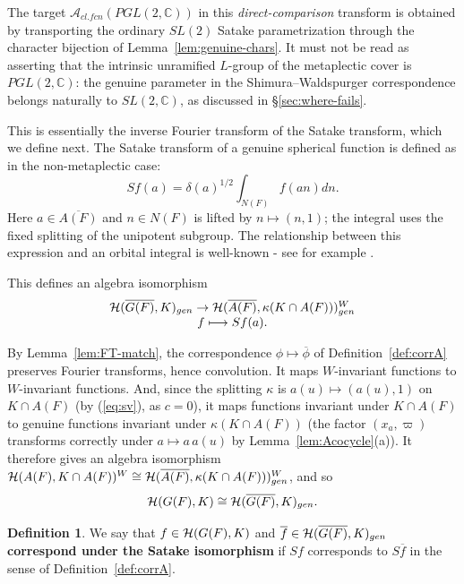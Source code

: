 \documentclass[12pt,letterpaper,openany]{book}
\theoremstyle{plain}
\theoremstyle{definition}
\newtheorem{definition}[theorem]{Definition}
\theoremstyle{remark}
\theoremstyle{remark}
\begin{document}
The target $\mathcal A_{cl.fcn}(PGL(2,\mathbb C))$
in this \emph{direct-comparison} transform is obtained by
transporting the ordinary $SL(2)$ Satake parametrization
through the character bijection of Lemma~\ref{lem:genuine-chars}.
It must not be read as asserting that the intrinsic unramified
$L$-group of the metaplectic cover is $PGL(2,\mathbb C)$:
the genuine parameter in the Shimura--Waldspurger correspondence
belongs naturally to $SL(2,\mathbb C)$, as discussed in
\S\ref{sec:where-fails}.

This is essentially the inverse Fourier transform of the Satake
transform, which we define next. The Satake transform of a
genuine spherical function is defined as in the non-metaplectic case:
\begin{equation}
Sf(a)=\delta(a)^{1/2}\int_{N(F)}f(an)dn.
\end{equation}
Here $a\in\overline{A(F)}$ and $n\in N(F)$ is lifted by
$n\mapsto(n,1)$; the integral uses the fixed splitting of the
unipotent subgroup.
The relationship between this expression and an orbital integral
is well-known - see for example \cite{C}.

This defines an algebra isomorphism
\begin{equation}
\begin{array}{c}
{\cal{H}}(\overline{G(F)},K)_{gen}\rightarrow
{\cal{H}}(\overline{A(F)},\kappa(K\cap A(F)))^W_{gen}\\
f\longmapsto Sf(a).
\end{array}
\end{equation}

By Lemma~\ref{lem:FT-match}, the correspondence $\phi\mapsto\overline\phi$
of Definition~\ref{def:corrA} preserves Fourier transforms, hence
convolution. It maps $W$-invariant functions to $W$-invariant functions.
And, since the splitting $\kappa$ is $a(u)\mapsto(a(u),1)$ on $K\cap A(F)$
(by (\ref{eq:sv}), as $c=0$), it maps functions invariant under
$K\cap A(F)$ to genuine functions invariant under $\kappa(K\cap A(F))$
(the factor $(x_a,\varpi)$ transforms correctly under $a\mapsto a\,a(u)$
by Lemma~\ref{lem:Acocycle}(a)). It therefore gives an algebra isomorphism
${\cal{H}}(A(F),K\cap A(F))^W\cong
{\cal{H}}(\overline{A(F)},\kappa(K\cap A(F)))^W_{gen}$, and so
\[
{\cal{H}}(G(F),K)\cong{\cal{H}}(\overline{G(F)},K)_{gen}.
\]

\begin{definition}\label{def:satake-corr}
We say that $f\in{\cal H}(G(F),K)$ and
$\overline f\in{\cal H}(\overline{G(F)},K)_{gen}$ {\bf correspond under
the Satake isomorphism} if $Sf$ corresponds to $S\overline{f}$ in the
sense of Definition~\ref{def:corrA}.
\end{definition}
\end{document}
